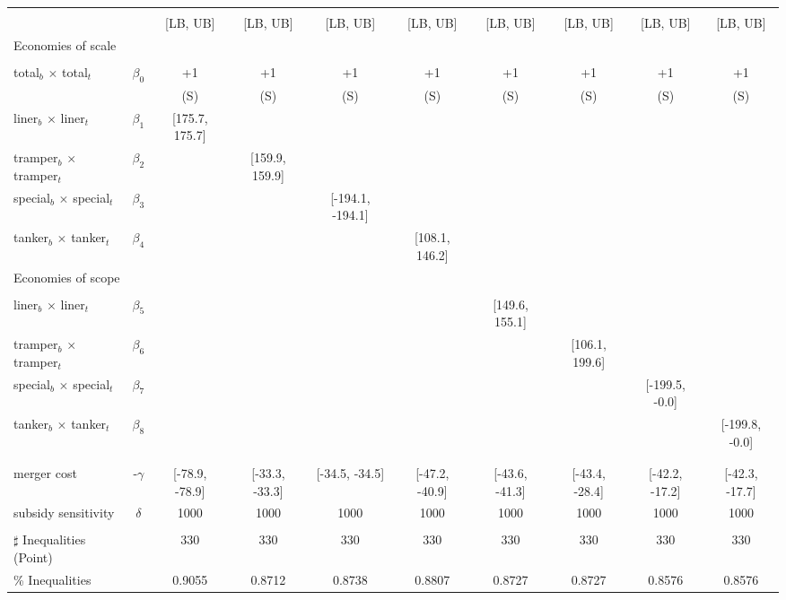 \begin{tabular}{@{\extracolsep{5pt}}lccccccccc}
\toprule 
 &  &  &  &  &  &  &  &  &  \\
 &  & [LB, UB] & [LB, UB] & [LB, UB] & [LB, UB] & [LB, UB] & [LB, UB] & [LB, UB] & [LB, UB] \\
\midrule 
Economies of scale &  &  &  &  &  &  &  \\
 &  &  &  &  &  &  &  &  \\
total$_{b}$ $\times$ total$_{t}$ & $\beta_0$ & +1 & +1 & +1 & +1 & +1 & +1 & +1 & +1 \\
 &  & (S) & (S) & (S) & (S) & (S) & (S) & (S) & (S) \\
liner$_{b}$ $\times$ liner$_{t}$ & $\beta_1$ & [175.7, 175.7] &  &  &  &  &  &  &  \\
tramper$_{b}$ $\times$ tramper$_{t}$ & $\beta_2$ &  & [159.9, 159.9] &  &  &  &  &  &  \\
special$_{b}$ $\times$ special$_{t}$ & $\beta_3$ &  &  & [-194.1, -194.1] &  &  &  &  &  \\
tanker$_{b}$ $\times$ tanker$_{t}$ & $\beta_4$ &  &  &  & [108.1, 146.2] &  &  &  &  \\
Economies of scope &  &  &  &  &  &  &  &  &  \\
 &  &  &  &  &  &  &  &  &  \\
liner$_{b}$ $\times$ liner$_{t}$ & $\beta_5$ &  &  &  &  & [149.6, 155.1] &  &  &  \\
tramper$_{b}$ $\times$ tramper$_{t}$ & $\beta_6$ &  &  &  &  &  & [106.1, 199.6] &  &  \\
special$_{b}$ $\times$ special$_{t}$ & $\beta_7$ &  &  &  &  &  &  & [-199.5, -0.0] &  \\
tanker$_{b}$ $\times$ tanker$_{t}$ & $\beta_8$ &  &  &  &  &  &  &  & [-199.8, -0.0] \\
 &  &  &  &  &  &  &  &  &  \\
 &  &  &  &  &  &  &  &  &  \\
merger cost & -$\gamma$ & [-78.9, -78.9] & [-33.3, -33.3] & [-34.5, -34.5] & [-47.2, -40.9] & [-43.6, -41.3] & [-43.4, -28.4] & [-42.2, -17.2] & [-42.3, -17.7] \\
subsidy sensitivity & $\delta$ & 1000 & 1000 & 1000 & 1000 & 1000 & 1000 & 1000 & 1000 \\
 &  &  &  &  &  &  &  &  &  \\
\hline 
$\sharp$ Inequalities (Point) &  & 330 & 330 & 330 & 330 & 330 & 330 & 330 & 330 \\
\% Inequalities &  & 0.9055 & 0.8712 & 0.8738 & 0.8807 & 0.8727 & 0.8727 & 0.8576 & 0.8576 \\
\bottomrule 
\end{tabular}
